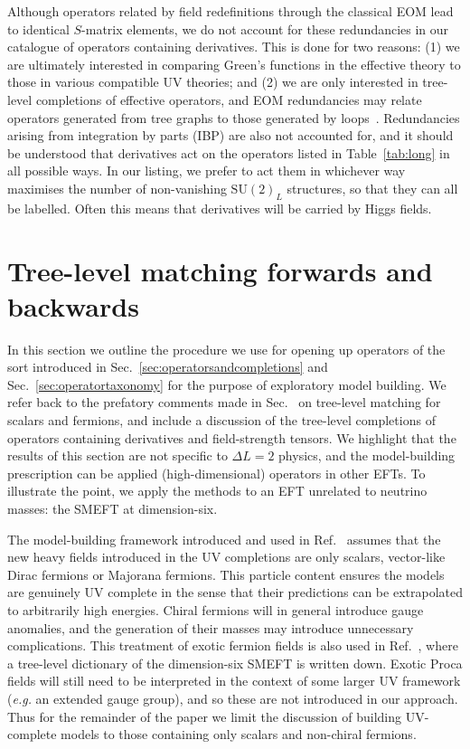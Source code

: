 Although operators related by field redefinitions through the classical EOM lead
to identical $S$-matrix elements, we do not account for these redundancies in
our catalogue of operators containing derivatives. This is done for two reasons:
(1) we are ultimately interested in comparing Green's functions in the effective
theory to those in various compatible UV theories; and (2) we are only
interested in tree-level completions of effective operators, and EOM
redundancies may relate operators generated from tree graphs to those generated
by loops~\cite{Arzt:1994gp, Einhorn:2013kja}. Redundancies arising from
integration by parts (IBP) are also not accounted for, and it should be
understood that derivatives act on the operators listed in Table~\ref{tab:long}
in all possible ways. In our listing, we prefer to act them in whichever way
maximises the number of non-vanishing $\mathrm{SU}(2)_{L}$ structures, so that
they can all be labelled. Often this means that derivatives will be carried by
Higgs fields.

\section{Tree-level matching forwards and backwards}
\label{sec:treelevelmatching}

In this section we outline the procedure we use for opening up operators of the
sort introduced in Sec.~\ref{sec:operatorsandcompletions} and
Sec.~\ref{sec:operatortaxonomy} for the purpose of exploratory model building.
We refer back to the prefatory comments made in Sec.~\cite{} on tree-level
matching for scalars and fermions, and include a discussion of the tree-level
completions of operators containing derivatives and field-strength tensors. We
highlight that the results of this section are not specific to $\Delta L = 2$
physics, and the model-building prescription can be applied (high-dimensional)
operators in other EFTs. To illustrate the point, we apply the methods to an EFT
unrelated to neutrino masses: the SMEFT at dimension-six.

The model-building framework introduced and used in Ref.~\cite{Angel:2012ug}
assumes that the new heavy fields introduced in the UV completions are only
scalars, vector-like Dirac fermions or Majorana fermions. This particle content
ensures the models are genuinely UV complete in the sense that their predictions
can be extrapolated to arbitrarily high energies. Chiral fermions will in
general introduce gauge anomalies, and the generation of their masses may
introduce unnecessary complications. This treatment of exotic fermion fields is
also used in Ref.~\cite{deBlas:2017xtg}, where a tree-level dictionary of the
dimension-six SMEFT is written down. Exotic Proca fields will still need to be
interpreted in the context of some larger UV framework (\textit{e.g.} an
extended gauge group), and so these are not introduced in our approach. Thus for
the remainder of the paper we limit the discussion of building UV-complete
models to those containing only scalars and non-chiral fermions.

